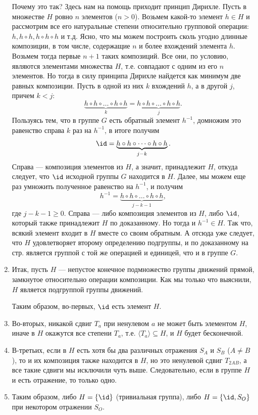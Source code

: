 \begin{enumerate}
Почему это так? Здесь нам на помощь приходит принцип Дирихле. Пусть в множестве $H$ ровно $n$ элементов ($n>0$). Возьмем какой-то элемент $h\in H$ и рассмотрим все его натуральные степени относительно групповой операции: $h, h\circ h, h\circ h\circ h$ и т.д. Ясно, что мы можем построить сколь угодно длинные композиции, в том числе, содержащие $n$ и более вхождений элемента $h$. Возьмем тогда первые $n+1$ таких композиций. Все они, по условию, являются элементами множества $H$, т.е. совпадают с одним из его $n$ элементов. Но тогда в силу принципа Дирихле найдется как минимум две равных композиции. Пусть в одной из них $k$ вхождений $h$, а в другой $j$, причем $k<j$:
$$
\underbrace{h\circ h\circ\dots\circ h\circ h}_{k} = \underbrace{h\circ h\circ\dots\circ h\circ h}_{j}.
$$
Пользуясь тем, что в группе $G$ есть обратный элемент $h^{-1}$, домножим это равенство справа $k$ раз на $h^{-1}$, в итоге получим
$$
\id = \underbrace{h\circ h\circ\dots\circ h\circ h}_{j-k}.
$$
Справа --- композиция элементов из $H$, а значит, принадлежит $H$, откуда следует, что $\id$ исходной группы $G$ находится в $H$. Далее, мы можем еще раз умножить полученное равенство на $h^{-1}$, и получим
$$
h^{-1} = \underbrace{h\circ h\circ\dots\circ h\circ h}_{j-k-1},
$$
где $j-k-1\ge 0$. Справа --- либо композиция элементов из $H$, либо $\id$, который также принадлежит $H$ по доказанному. Но тогда и $h^{-1}\in H$. Так что, всякий элемент входит в $H$ вместе со своим обратным. А отсюда уже следует, что $H$ удовлетворяет второму определению подгруппы, и по доказанному на стр. \pageref{Subgroup} является группой с той же операцией и единицей, что и в группе $G$.

\item Итак, пусть $H$ --- непустое конечное подмножество группы движений прямой, замкнутое относительно операции композиции. Как мы только что выяснили, $H$ является подгруппой группы движений.

Таким образом, во-первых, $\id$ есть элемент $H$.

\item Во-вторых, никакой сдвиг $T_a$ при ненулевом $a$ не может быть элементом $H$, иначе в $H$ окажутся все степени $T_a$, т.е. $\langle T_a\rangle \subseteq H$, и $H$ будет бесконечной.
\item В-третьих, если в $H$ есть хотя бы два различных отражения $S_A$ и $S_B$ ($A\ne B$), то и их композиция также находится в $H$, но это ненулевой сдвиг $T_{2AB}$, а все такие сдвиги мы исключили чуть выше. Следовательно, если в группе $H$ и есть отражение, то только одно.
\item Таким образом, либо $H=\{\id\}$ (тривиальная группа), либо $H=\{\id, S_O\}$ при некотором отражении $S_O$.
\end{enumerate}


